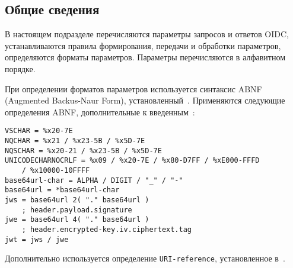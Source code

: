 \label{PARAMS}

\subsection{Общие сведения}\label{PARAMS.Syntax}

В настоящем подразделе перечисляются параметры запросов и ответов OIDC, 
устанавливаются правила формирования, передачи и обработки параметров, 
определяются форматы параметров.
%
Параметры перечисляются в алфавитном порядке.

При определении форматов параметров используется синтаксис ABNF (Augmented 
Backus-Naur Form), установленный~\cite{RFC5234}. 
%
Применяются следующие определения ABNF, дополнительные к введенным~\cite{RFC5234}:
\begin{lstlisting}
VSCHAR = %x20-7E
NQCHAR = %x21 / %x23-5B / %x5D-7E
NQSCHAR = %x20-21 / %x23-5B / %x5D-7E
UNICODECHARNOCRLF = %x09 / %x20-7E / %x80-D7FF / %xE000-FFFD 
    / %x10000-10FFFF
base64url-char = ALPHA / DIGIT / "_" / "-"
base64url = *base64url-char
jws = base64url 2( "." base64url )
    ; header.payload.signature
jwe = base64url 4( "." base64url )
    ; header.encrypted-key.iv.ciphertext.tag
jwt = jws / jwe
\end{lstlisting}

Дополнительно используется определение \lstinline{URI-reference}, 
установленное в~\cite{RFC3986}.


